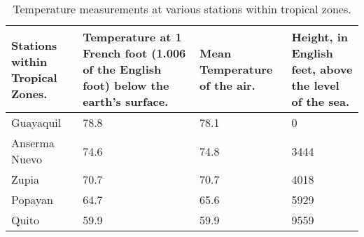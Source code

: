 \begin{table}[h!]
    \centering
    \caption{Temperature measurements at various stations within tropical zones.}
    \label{tab:temperature}
    \begin{tabular}{m{2cm} m{3cm} m{2cm} m{2cm}}
    \toprule
    \textbf{Stations within Tropical Zones.} & \textbf{Temperature at 1 French foot (1.006 of the English foot) below the earth's surface.} & \textbf{Mean Temperature of the air.} & \textbf{Height, in English feet, above the level of the sea.} \\
    \midrule
    Guayaquil & 78.8 & 78.1 & 0 \\
    Anserma Nuevo & 74.6 & 74.8 & 3444 \\
    Zupia & 70.7 & 70.7 & 4018 \\
    Popayan & 64.7 & 65.6 & 5929 \\
    Quito & 59.9 & 59.9 & 9559 \\
    \end{tabular}
\end{table}